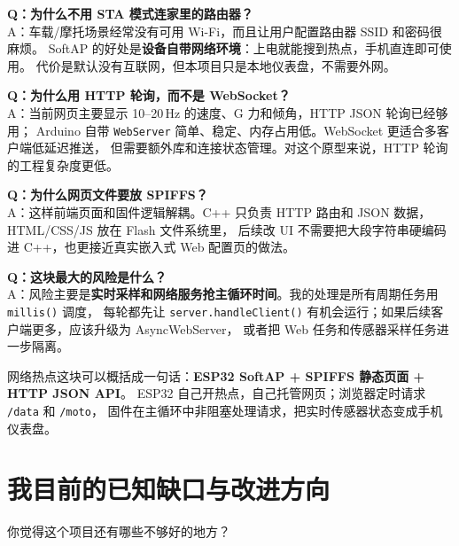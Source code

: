\documentclass[UTF8,11pt,a4paper]{ctexart}
\begin{document}
\begin{followup}
\textbf{Q：为什么不用 STA 模式连家里的路由器？}\\
A：车载/摩托场景经常没有可用 Wi-Fi，而且让用户配置路由器 SSID 和密码很麻烦。
SoftAP 的好处是\textbf{设备自带网络环境}：上电就能搜到热点，手机直连即可使用。
代价是默认没有互联网，但本项目只是本地仪表盘，不需要外网。

\medskip
\textbf{Q：为什么用 HTTP 轮询，而不是 WebSocket？}\\
A：当前网页主要显示 10--20\,Hz 的速度、G 力和倾角，HTTP JSON 轮询已经够用；
Arduino 自带 \texttt{WebServer} 简单、稳定、内存占用低。WebSocket 更适合多客户端低延迟推送，
但需要额外库和连接状态管理。对这个原型来说，HTTP 轮询的工程复杂度更低。

\medskip
\textbf{Q：为什么网页文件要放 SPIFFS？}\\
A：这样前端页面和固件逻辑解耦。C++ 只负责 HTTP 路由和 JSON 数据，HTML/CSS/JS 放在 Flash 文件系统里，
后续改 UI 不需要把大段字符串硬编码进 C++，也更接近真实嵌入式 Web 配置页的做法。

\medskip
\textbf{Q：这块最大的风险是什么？}\\
A：风险主要是\textbf{实时采样和网络服务抢主循环时间}。我的处理是所有周期任务用 \texttt{millis()} 调度，
每轮都先让 \texttt{server.handleClient()} 有机会运行；如果后续客户端更多，应该升级为 AsyncWebServer，
或者把 Web 任务和传感器采样任务进一步隔离。
\end{followup}

\begin{summary}
网络热点这块可以概括成一句话：\textbf{ESP32 SoftAP + SPIFFS 静态页面 + HTTP JSON API}。
ESP32 自己开热点，自己托管网页；浏览器定时请求 \texttt{/data} 和 \texttt{/moto}，
固件在主循环中非阻塞处理请求，把实时传感器状态变成手机仪表盘。
\end{summary}

\section{我目前的已知缺口与改进方向}

\begin{interviewer}
你觉得这个项目还有哪些不够好的地方？
\end{interviewer}
\end{document}
